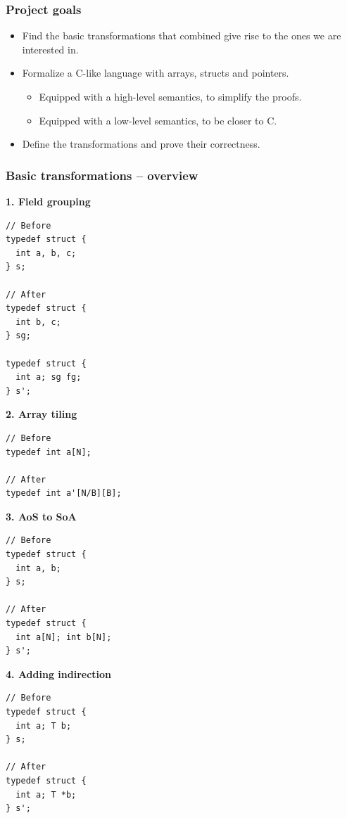 \begin{frame}[fragile]
\frametitle{Project goals}

\begin{itemize}
	\setlength\itemsep{1.5em}
	\item Find the basic transformations that combined give rise to the ones we are interested in.\\ \pause
	\item Formalize a C-like language with arrays, structs and pointers.
	\begin{itemize}
		\item Equipped with a high-level semantics, to simplify the proofs.
		\item Equipped with a low-level semantics, to be closer to C.
	\end{itemize} \pause
	\item Define the transformations and prove their correctness.
\end{itemize}

\end{frame}


\begin{frame}[fragile]
\frametitle{Basic transformations -- overview}

\begin{center}
\begin{minipage}{0.45\linewidth}
\textbf{\small 1. Field grouping}
\begin{lstlisting}[style=Cstyle, basicstyle=\scriptsize]
// Before
typedef struct {
  int a, b, c;
} s;

// After
typedef struct {
  int b, c;
} sg;

typedef struct {
  int a; sg fg;
} s';
\end{lstlisting}
\textbf{\small 2. Array tiling}
\begin{lstlisting}[style=Cstyle, basicstyle=\scriptsize]
// Before
typedef int a[N];

// After
typedef int a'[N/B][B];
\end{lstlisting}
\end{minipage}%
\begin{minipage}{0.45\linewidth}
\textbf{\small 3. AoS to SoA}
\begin{lstlisting}[style=Cstyle, basicstyle=\scriptsize]
// Before
typedef struct {
  int a, b;
} s;

// After
typedef struct {
  int a[N]; int b[N];
} s';
\end{lstlisting}
\textbf{\small 4. Adding indirection}
\begin{lstlisting}[style=Cstyle, basicstyle=\scriptsize]
// Before
typedef struct {
  int a; T b;
} s;

// After
typedef struct {
  int a; T *b;
} s';
\end{lstlisting}
\end{minipage}
\end{center}

\end{frame}


